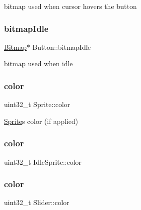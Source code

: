 bitmap used when cursor hovers the button 

\mbox{\label{group__sprite_ga509d33b7b3b9dd4f7c10c3c05c0a6ca0}} 
\subsubsection{\texorpdfstring{bitmap\+Idle}{bitmapIdle}}
{\footnotesize\ttfamily \mbox{\hyperlink{struct_bitmap}{Bitmap}}$\ast$ Button\+::bitmap\+Idle}



bitmap used when idle 

\mbox{\label{group__sprite_ga925050b598e308e3da33683aa2cb2aa7}} 
\subsubsection{\texorpdfstring{color}{color}\hspace{0.1cm}{\footnotesize\ttfamily [1/3]}}
{\footnotesize\ttfamily uint32\+\_\+t Sprite\+::color}



\mbox{\hyperlink{struct_sprite}{Sprite}}\textquotesingle{}s color (if applied) 

\mbox{\label{group__sprite_gaf2cfbfe5f907f5f0abbd8d673bce19db}} 
\subsubsection{\texorpdfstring{color}{color}\hspace{0.1cm}{\footnotesize\ttfamily [2/3]}}
{\footnotesize\ttfamily uint32\+\_\+t Idle\+Sprite\+::color}

\mbox{\label{group__sprite_ga0ec90999b2ad7a80de51ebbf6603af87}} 
\subsubsection{\texorpdfstring{color}{color}\hspace{0.1cm}{\footnotesize\ttfamily [3/3]}}
{\footnotesize\ttfamily uint32\+\_\+t Slider\+::color}



